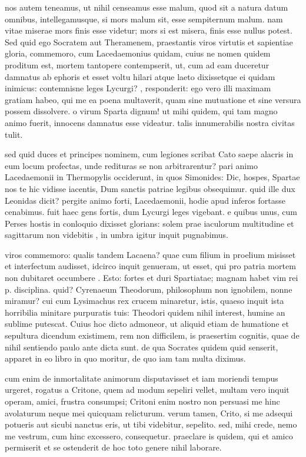  nos autem teneamus, ut nihil censeamus esse malum, quod sit a natura datum omnibus, intellegamusque, si mors malum sit, esse sempiternum malum. nam vitae miserae mors finis esse videtur; mors si est misera, finis esse nullus potest. Sed quid ego Socratem aut Theramenem, praestantis viros virtutis et sapientiae gloria, commemoro, cum Lacedaemonius quidam, cuius ne nomen quidem proditum est, mortem tantopere contempserit, ut, cum ad eam duceretur damnatus ab ephoris et esset voltu hilari atque laeto dixissetque ei quidam inimicus: contemnisne leges Lycurgi? , responderit: ego vero illi maximam gratiam habeo, qui me ea poena multaverit, quam sine mutuatione et sine versura possem dissolvere. o virum Sparta dignum! ut mihi quidem, qui tam magno animo fuerit, innocens damnatus esse videatur. talis innumerabilis nostra civitas tulit.

 sed quid duces et principes nominem, cum legiones scribat Cato saepe alacris in eum locum profectas, unde redituras se non arbitrarentur? pari animo Lacedaemonii in Thermopylis occiderunt, in quos Simonides: Dic, hospes, Spartae nos te hic vidisse iacentis, Dum sanctis patriae legibus obsequimur. quid ille dux Leonidas dicit? pergite animo forti, Lacedaemonii, hodie apud inferos fortasse cenabimus. fuit haec gens fortis, dum Lycurgi leges vigebant. e quibus unus, cum Perses hostis in conloquio dixisset glorians: solem prae iaculorum multitudine et sagittarum non videbitis , in umbra igitur inquit pugnabimus.

 viros commemoro: qualis tandem Lacaena? quae cum filium in proelium misisset et interfectum audisset, idcirco inquit genueram, ut esset, qui pro patria mortem non dubitaret occumbere . Esto: fortes et duri Spartiatae; magnam habet vim rei p. disciplina. quid? Cyrenaeum Theodorum, philosophum non ignobilem, nonne miramur? cui cum Lysimachus rex crucem minaretur, istis, quaeso inquit ista horribilia minitare purpuratis tuis: Theodori quidem nihil interest, humine an sublime putescat. Cuius hoc dicto admoneor, ut aliquid etiam de humatione et sepultura dicendum existimem, rem non difficilem, is praesertim cognitis, quae de nihil sentiendo paulo ante dicta sunt. de qua Socrates quidem quid senserit, apparet in eo libro in quo moritur, de quo iam tam multa diximus.

 cum enim de inmortalitate animorum disputavisset et iam moriendi tempus urgeret, rogatus a Critone, quem ad modum sepeliri vellet, multam vero inquit operam, amici, frustra consumpsi; Critoni enim nostro non persuasi me hinc avolaturum neque mei quicquam relicturum. verum tamen, Crito, si me adsequi potueris aut sicubi nanctus eris, ut tibi videbitur, sepelito. sed, mihi crede, nemo me vestrum, cum hinc excessero, consequetur. praeclare is quidem, qui et amico permiserit et se ostenderit de hoc toto genere nihil laborare.

